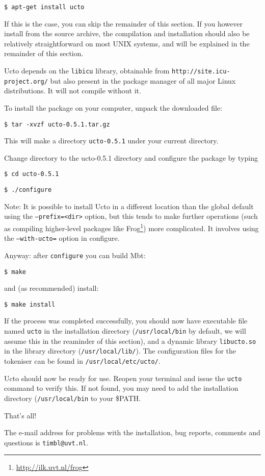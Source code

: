 \documentclass{report}
\begin{document}
{\tt \$ apt-get install ucto}    

If this is the case, you can skip the remainder of this section. If you however install from the source archive, the compilation and installation should also be relatively straightforward on most UNIX systems, and will be explained in the remainder of this section. 

Ucto depends on the {\tt libicu} library, obtainable from {\tt http://site.icu-project.org/} but also present in the package manager of all major Linux distributions. It will not compile without it.

To install the package on your computer, unpack the downloaded file:

{\tt \$ tar -xvzf ucto-0.5.1.tar.gz}

This will make a directory {\tt ucto-0.5.1} under your current directory.

Change directory to the ucto-0.5.1 directory and configure the package by typing

{\tt \$ cd ucto-0.5.1}

{\tt \$ ./configure}


Note: It is possible to install Ucto in a different location than the global default using the \texttt{--prefix=<dir>} option, but this tends to make further operations (such as compiling higher-level packages like Frog\footnote{\url{http://ilk.uvt.nl/frog}}) more complicated. It involves using the {\tt --with-ucto=} option in configure. 
 
Anyway: after {\tt configure} you can build Mbt:

{\tt \$ make}

and (as recommended) install:

{\tt \$ make install }

If the process was completed successfully, you should now have
executable file named {\tt ucto} in the installation directory
({\tt /usr/local/bin} by default, we will assume this in the reaminder of this section), and a dynamic library {\tt libucto.so} in
the library directory ({\tt /usr/local/lib/}). The configuration files for the tokeniser can be found in {\tt /usr/local/etc/ucto/}.

Ucto should now be ready for use. Reopen your terminal and issue the {\tt ucto} command to verify this. If not found, you may need to add the installation directory ({\tt /usr/local/bin} to your \$PATH. 

That's all!

The e-mail address for problems with the installation, bug reports,
comments and questions is {\tt timbl@uvt.nl}.
\end{document}
